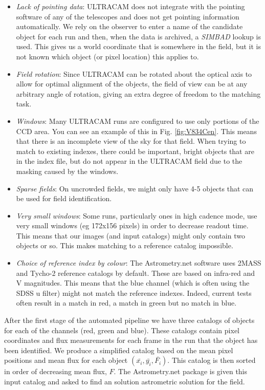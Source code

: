 \begin{itemize}
	\item \emph{Lack of pointing data}: ULTRACAM does not integrate with the pointing software of any of the telescopes and does not get pointing information automatically. We rely on the observer to enter a name of the candidate object for each run and then, when the data is archived, a \emph{SIMBAD} lookup is used. This gives us a world coordinate that is somewhere in the field, but it is not known which object (or pixel location) this applies to.  
	\item \emph{Field rotation}: Since ULTRACAM can be rotated about the optical axis to allow for optimal alignment of the objects, the field of view can be at any arbitrary angle of rotation, giving an extra degree of freedom to the matching task. 
	\item \emph{Windows}: Many ULTRACAM runs are configured to use only portions of the CCD area. You can see an example of this in Fig.  \ref{fig:V834Cen}. This means that there is an incomplete view of the sky for that field. When trying to match to existing indexes, there could be important, bright objects that are in the index file, but do not appear in the ULTRACAM field due to the masking caused by the windows.
	\item \emph{Sparse fields}: On uncrowded fields, we might only have 4-5 objects that can be used for field identification. 
	\item \emph{Very small windows}: Some runs, particularly ones in high cadence mode, use very small windows (eg 172x156 pixels) in order to decrease readout time. This means that our images (and input catalogs) might only contain two objects or so. This makes matching to a reference catalog impossible. 
	\item \emph{Choice of reference index by colour}: The Astrometry.net software uses 2MASS and Tycho-2 reference catalogs by default. These are based on infra-red and V magnitudes. This means that the blue channel (which is often using the SDSS u filter) might not match the reference indexes. Indeed, current tests often result in a match in red, a match in green but no match in blue. 
\end{itemize}

After the first stage of the automated pipeline we have three catalogs of objects for each of the channels (red, green and blue). These catalogs contain pixel coordinates and flux measurements for each frame in the run that the object has been identified. We produce a simplified catalog based on the mean pixel positions and mean flux for each object $(\bar{x_i}, \bar{y_i}, \bar{F_i})$. This catalog is then sorted in order of decreasing mean flux, $F$. The Astrometry.net package is given this input catalog and asked to find an solution astrometric solution for the field. 

